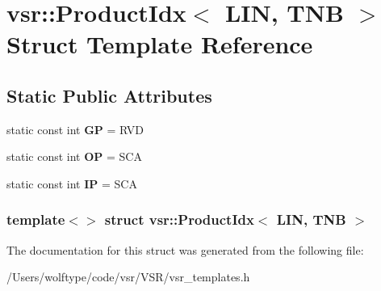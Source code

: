 \hypertarget{structvsr_1_1_product_idx_3_01_l_i_n_00_01_t_n_b_01_4}{\section{vsr\-:\-:Product\-Idx$<$ L\-I\-N, T\-N\-B $>$ Struct Template Reference}
\label{structvsr_1_1_product_idx_3_01_l_i_n_00_01_t_n_b_01_4}
}
\subsection*{Static Public Attributes}
\begin{DoxyCompactItemize}
\item 
\hypertarget{structvsr_1_1_product_idx_3_01_l_i_n_00_01_t_n_b_01_4_ab62169d69ccaa0e44edbfb87a355eb15}{static const int {\bfseries G\-P} = R\-V\-D}\label{structvsr_1_1_product_idx_3_01_l_i_n_00_01_t_n_b_01_4_ab62169d69ccaa0e44edbfb87a355eb15}

\item 
\hypertarget{structvsr_1_1_product_idx_3_01_l_i_n_00_01_t_n_b_01_4_af48c4dc6827705690bf93c4534c2ee4d}{static const int {\bfseries O\-P} = S\-C\-A}\label{structvsr_1_1_product_idx_3_01_l_i_n_00_01_t_n_b_01_4_af48c4dc6827705690bf93c4534c2ee4d}

\item 
\hypertarget{structvsr_1_1_product_idx_3_01_l_i_n_00_01_t_n_b_01_4_a914e0080bec854f5e56f6ccb75859fcc}{static const int {\bfseries I\-P} = S\-C\-A}\label{structvsr_1_1_product_idx_3_01_l_i_n_00_01_t_n_b_01_4_a914e0080bec854f5e56f6ccb75859fcc}

\end{DoxyCompactItemize}
\subsubsection*{template$<$$>$ struct vsr\-::\-Product\-Idx$<$ L\-I\-N, T\-N\-B $>$}



The documentation for this struct was generated from the following file\-:\begin{DoxyCompactItemize}
\item 
/\-Users/wolftype/code/vsr/\-V\-S\-R/vsr\-\_\-templates.\-h\end{DoxyCompactItemize}
